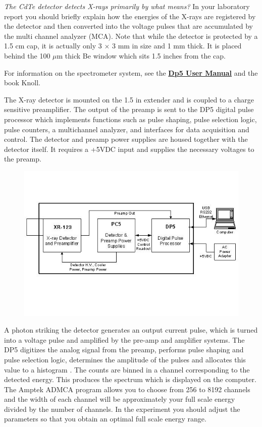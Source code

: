 \documentclass{../lab}
\begin{document}
\emph{The CdTe detector detects X-rays primarily by what means?} In your laboratory report you should briefly explain how the energies of the X-rays are registered by the detector and then converted into the voltage pulses that are accumulated by the multi channel analyzer (MCA). Note that while the detector is protected by a 1.5 cm cap, it is actually only 3 $\times$ 3 mm in size and 1 mm thick. It is placed behind the 100 $\mu$m thick Be window which sits 1.5 inches from the cap.

For information on the spectrometer system, see the \href{http://experimentationlab.berkeley.edu/sites/default/files/images/DP5\_User\_Manual\_A1.pdf}{\textbf{Dp5 User Manual}} and the book Knoll.

The X-ray detector is mounted on the 1.5 in extender and is coupled to a charge sensitive preamplifier. The output of the preamp is sent to the DP5 digital pulse processor which implements functions such as pulse shaping, pulse selection logic, pulse counters, a multichannel analyzer, and interfaces for data acquisition and control. The detector and preamp power supplies are housed together with the detector itself. It requires a +5VDC input and supplies the necessary voltages to the preamp.

\begin{figure}
    \centering
    \href{http://experimentationlab.berkeley.edu/sites/default/files/images/COMimage01.jpg}{\includegraphics[width=0.7\linewidth]{images/COMimage01.jpg}}
    \caption{}
    \label{COMimage01}
\end{figure}

A photon striking the detector generates an output current pulse, which is turned into a voltage pulse and amplified by the pre-amp and amplifier systems. The DP5 digitizes the analog signal from the preamp, performs pulse shaping and pulse selection logic, determines the amplitude of the pulses and allocates this value to a histogram . The counts are binned in a channel corresponding to the detected energy. This produces the spectrum which is displayed on the computer. The Amptek ADMCA program allows you to choose from 256 to 8192 channels and the width of each channel will be approximately your full scale energy divided by the number of channels. In the experiment you should adjust the parameters so that you obtain an optimal full scale energy range. 
\end{document}
